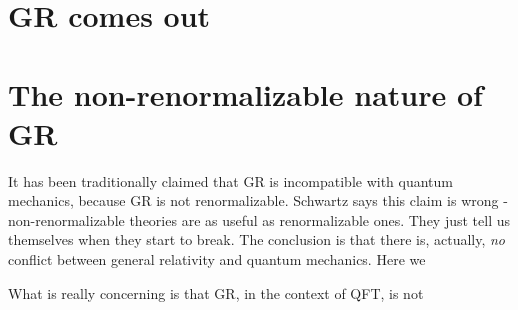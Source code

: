 \documentclass[hyperref, a4paper]{article}
\begin{document}
\section{GR comes out}

\section{The non-renormalizable nature of GR} 

It has been traditionally claimed that GR is incompatible with quantum mechanics, because GR is not renormalizable. 
Schwartz says this claim is wrong - non-renormalizable theories are as useful as renormalizable ones. They just 
tell us themselves when they start to break. 
The conclusion is that there is, actually, \emph{no} conflict between general relativity and quantum mechanics.
Here we 

What is really concerning is that GR, in the context of QFT, is not 


 
\end{document}
